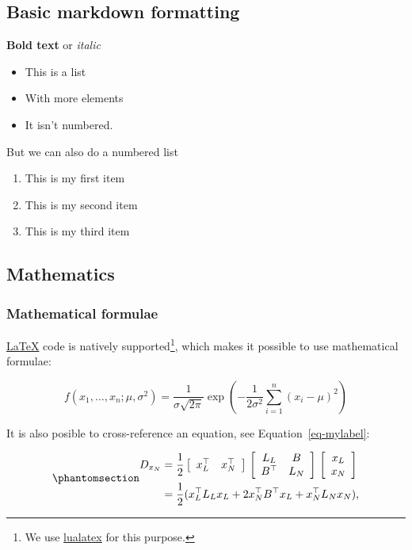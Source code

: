 \documentclass[
  11pt,
  a4paper,
]{article}
\providecommand{\tightlist}{%
  \setlength{\itemsep}{0pt}\setlength{\parskip}{0pt}}\usepackage{longtable,booktabs,array}
\theoremstyle{plain}
\theoremstyle{remark}
\begin{document}
\subsection{Basic markdown formatting}\label{basic-markdown-formatting}

\textbf{Bold text} or \emph{italic}

\begin{itemize}
\tightlist
\item
  This is a list
\item
  With more elements
\item
  It isn't numbered.
\end{itemize}

But we can also do a numbered list

\begin{enumerate}
\def\labelenumi{\arabic{enumi}.}
\tightlist
\item
  This is my first item
\item
  This is my second item
\item
  This is my third item
\end{enumerate}

\subsection{Mathematics}\label{mathematics}

\subsubsection{Mathematical formulae}\label{mathematical-formulae}

\href{https://www.latex-project.org/}{LaTeX} code is natively
supported\footnote{We use \href{https://lualatex.org/}{lualatex} for
  this purpose.}, which makes it possible to use mathematical formulae:

\[
f(x_1, \dots, x_n; \mu, \sigma^2) =
\frac{1}{\sigma \sqrt{2\pi}} \exp{\left(- \frac{1}{2\sigma^2}\sum_{i=1}^n(x_i - \mu)^2\right)}
\]

It is also posible to cross-reference an equation, see
Equation~\ref{eq-mylabel}:

\begin{equation}\phantomsection\label{eq-mylabel}{
\begin{aligned}
D_{x_N} & = \frac12
\left[\begin{array}{cc}
x_L^\top & x_N^\top \end{array}\right] \,
\left[\begin{array}{cc}  L_L & B \\ B^\top & L_N \end{array}\right] \,
\left[\begin{array}{c}
x_L \\ x_N \end{array}\right] \\
& = \frac12 (x_L^\top L_L x_L + 2 x_N^\top B^\top x_L + x_N^\top L_N x_N),
\end{aligned}
}\end{equation}
\end{document}
